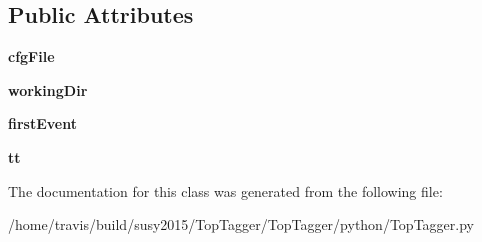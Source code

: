 \subsection*{Public Attributes}
\begin{DoxyCompactItemize}
\item 
\hypertarget{classTopTagger_1_1TopTagger_af45e65fc54f3253625c2acc07f6f5db9}{{\bfseries cfg\-File}}\label{classTopTagger_1_1TopTagger_af45e65fc54f3253625c2acc07f6f5db9}

\item 
\hypertarget{classTopTagger_1_1TopTagger_aa7493aff4f860df39acfed315f4bb90b}{{\bfseries working\-Dir}}\label{classTopTagger_1_1TopTagger_aa7493aff4f860df39acfed315f4bb90b}

\item 
\hypertarget{classTopTagger_1_1TopTagger_ad62b10aba9cc9bdb06e94f3f106a9c0f}{{\bfseries first\-Event}}\label{classTopTagger_1_1TopTagger_ad62b10aba9cc9bdb06e94f3f106a9c0f}

\item 
\hypertarget{classTopTagger_1_1TopTagger_a400625b5e024d460bcef5109a4091241}{{\bfseries tt}}\label{classTopTagger_1_1TopTagger_a400625b5e024d460bcef5109a4091241}

\end{DoxyCompactItemize}


The documentation for this class was generated from the following file\-:\begin{DoxyCompactItemize}
\item 
/home/travis/build/susy2015/\-Top\-Tagger/\-Top\-Tagger/python/Top\-Tagger.\-py\end{DoxyCompactItemize}
